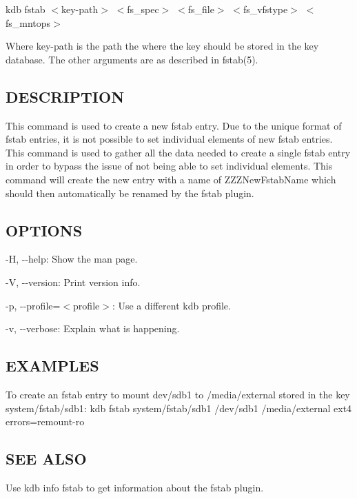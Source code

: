 {\ttfamily kdb fstab $<$key-\/path$>$ $<$fs\+\_\+spec$>$ $<$fs\+\_\+file$>$ $<$fs\+\_\+vfstype$>$ $<$fs\+\_\+mntops$>$}

Where {\ttfamily key-\/path} is the path the where the key should be stored in the key database. The other arguments are as described in fstab(5).

\subsection*{D\+E\+S\+C\+R\+I\+P\+T\+I\+O\+N}

This command is used to create a new {\ttfamily fstab} entry. Due to the unique format of {\ttfamily fstab} entries, it is not possible to set individual elements of new {\ttfamily fstab} entries. This command is used to gather all the data needed to create a single {\ttfamily fstab} entry in order to bypass the issue of not being able to set individual elements. This command will create the new entry with a name of {\ttfamily Z\+Z\+Z\+New\+Fstab\+Name} which should then automatically be renamed by the {\ttfamily fstab} plugin.

\subsection*{O\+P\+T\+I\+O\+N\+S}


\begin{DoxyItemize}
\item {\ttfamily -\/\+H}, {\ttfamily -\/-\/help}\+: Show the man page.
\item {\ttfamily -\/\+V}, {\ttfamily -\/-\/version}\+: Print version info.
\item {\ttfamily -\/p}, {\ttfamily -\/-\/profile}=$<$profile$>$\+: Use a different kdb profile.
\item {\ttfamily -\/v}, {\ttfamily -\/-\/verbose}\+: Explain what is happening.
\end{DoxyItemize}

\subsection*{E\+X\+A\+M\+P\+L\+E\+S}

To create an fstab entry to mount {\ttfamily dev/sdb1} to {\ttfamily /media/external} stored in the key {\ttfamily system/fstab/sdb1}\+: {\ttfamily kdb fstab system/fstab/sdb1 /dev/sdb1 /media/external ext4 errors=remount-\/ro}

\subsection*{S\+E\+E A\+L\+S\+O}


\begin{DoxyItemize}
\item Use {\ttfamily kdb info fstab} to get information about the fstab plugin. 
\end{DoxyItemize}